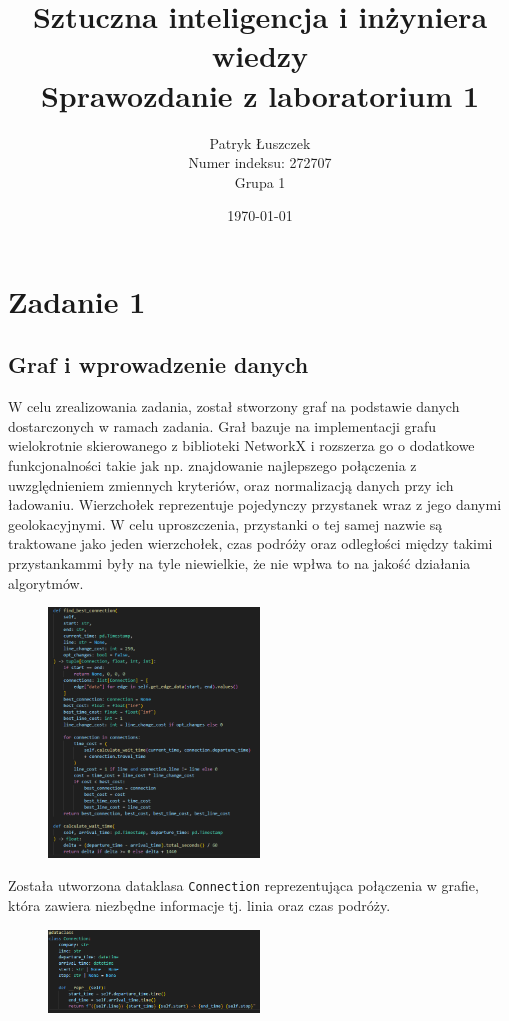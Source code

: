 \documentclass{article}
\title{Sztuczna inteligencja i inżyniera wiedzy\\
        Sprawozdanie z laboratorium 1}
\author{Patryk Łuszczek \\
        Numer indeksu: 272707
        \\ Grupa 1}
\date{\today}
\begin{document}
\maketitle

\section{Zadanie 1}
\subsection*{Graf i wprowadzenie danych}
W celu zrealizowania zadania, został stworzony graf na podstawie danych dostarczonych w ramach zadania.
Grał bazuje na implementacji grafu wielokrotnie skierowanego z biblioteki NetworkX i rozszerza go o dodatkowe funkcjonalności takie jak np. znajdowanie najlepszego połączenia z uwzględnieniem zmiennych kryteriów, oraz normalizacją
danych przy ich ładowaniu. Wierzchołek reprezentuje pojedynczy przystanek wraz z jego danymi geolokacyjnymi. W celu uproszczenia, przystanki o tej samej nazwie są traktowane jako jeden wierzchołek, czas podróży oraz odległości między takimi przystankammi były na tyle niewielkie,
że nie wpłwa to na jakość działania algorytmów.

\begin{figure}
    \centering
    \includegraphics[width=0.5\textwidth]{sc1.png}
\end{figure}

Została utworzona dataklasa \texttt{Connection} reprezentująca połączenia w grafie, która zawiera niezbędne informacje tj. linia oraz czas podróży.

\begin{figure}[H]
    \centering
    \includegraphics[width=0.5\textwidth]{sc2.png}
\end{figure}
\end{document}
